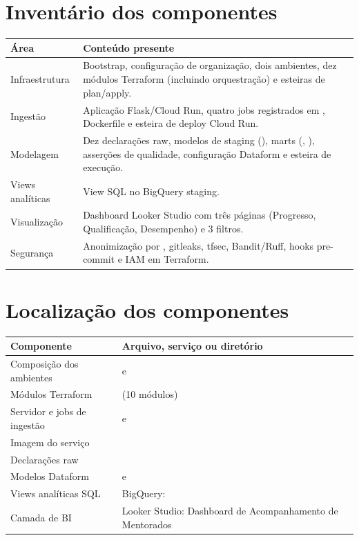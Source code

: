 \documentclass[11pt,a4paper]{article}
\begin{document}
\section{Inventário dos componentes}

\begin{tabularx}{\textwidth}{L{48mm}Y}
\toprule
\textbf{Área} & \textbf{Conteúdo presente} \\
\midrule
Infraestrutura & Bootstrap, configuração de organização, dois ambientes, dez módulos Terraform (incluindo orquestração) e esteiras de plan/apply. \\
Ingestão & Aplicação Flask/Cloud Run, quatro jobs registrados em , Dockerfile e esteira de deploy Cloud Run. \\
Modelagem & Dez declarações raw, modelos de staging (), marts (, ), asserções de qualidade, configuração Dataform e esteira de execução. \\
Views analíticas & View SQL  no BigQuery staging. \\
Visualização & Dashboard Looker Studio com três páginas (Progresso, Qualificação, Desempenho) e 3 filtros. \\
Segurança & Anonimização por , gitleaks, tfsec, Bandit/Ruff, hooks pre-commit e IAM em Terraform. \\
\bottomrule
\end{tabularx}

\section{Localização dos componentes}

\begin{tabularx}{\textwidth}{L{46mm}Y}
\toprule
\textbf{Componente} & \textbf{Arquivo, serviço ou diretório} \\
\midrule
Composição dos ambientes &  e  \\
Módulos Terraform &  (10 módulos) \\
Servidor e jobs de ingestão &  e  \\
Imagem do serviço &  \\
Declarações raw &  \\
Modelos Dataform &  e  \\
Views analíticas SQL & BigQuery:  \\
Camada de BI & Looker Studio: Dashboard de Acompanhamento de Mentorados \\
\bottomrule
\end{tabularx}
\end{document}
